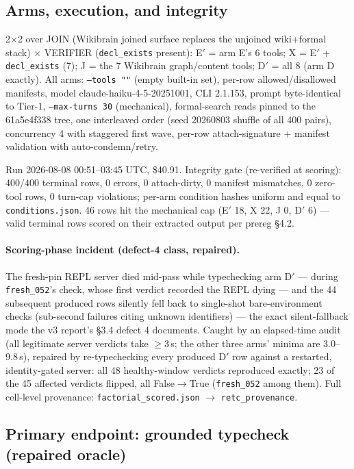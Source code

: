 \documentclass[10pt]{article}
\newcommand{\code}[1]{\texttt{#1}}
\begin{document}
\subsection{Arms, execution, and integrity}

2$\times$2 over JOIN (Wikibrain joined surface replaces the unjoined
wiki+formal stack) $\times$ VERIFIER (\code{decl\_exists} present):
E$'$ = arm E's 6 tools; X = E$'$ + \code{decl\_exists} (7); J = the 7
Wikibrain graph/content tools; D$'$ = all 8 (arm D exactly). All arms:
\code{--tools ""} (empty built-in set), per-row allowed/disallowed
manifests, model claude-haiku-4-5-20251001, CLI 2.1.153, prompt
byte-identical to Tier-1, \code{--max-turns 30} (mechanical),
formal-search reads pinned to the 61a5e4f338 tree, one interleaved
order (seed 20260803 shuffle of all 400 pairs), concurrency 4 with
staggered first wave, per-row attach-signature + manifest validation
with auto-condemn/retry.

Run 2026-08-08 00:51--03:45 UTC, \$40.91. Integrity gate (re-verified
at scoring): 400/400 terminal rows, 0 errors, 0 attach-dirty, 0
manifest mismatches, 0 zero-tool rows, 0 turn-cap violations; per-arm
condition hashes uniform and equal to \code{conditions.json}. 46 rows
hit the mechanical cap (E$'$ 18, X 22, J 0, D$'$ 6) --- valid terminal
rows scored on their extracted output per prereg \S 4.2.

\paragraph{Scoring-phase incident (defect-4 class, repaired).} The
fresh-pin REPL server died mid-pass while typechecking arm D$'$ ---
during \code{fresh\_052}'s check, whose first verdict recorded the
REPL dying --- and the 44 subsequent produced rows silently fell back
to single-shot bare-environment checks (sub-second failures citing
unknown identifiers) --- the exact silent-fallback mode the v3
report's \S 3.4 defect 4 documents. Caught by an elapsed-time audit
(all legitimate server verdicts take $\geq$3\,s; the other three
arms' minima are 3.0--9.8\,s), repaired by re-typechecking every
produced D$'$ row against a restarted, identity-gated server: all 48
healthy-window verdicts reproduced exactly; 23 of the 45 affected
verdicts flipped, all False$\to$True (\code{fresh\_052} among
them). Full cell-level provenance:
\code{factorial\_scored.json} $\to$ \code{retc\_provenance}.

\subsection{Primary endpoint: grounded typecheck (repaired oracle)}
\end{document}
